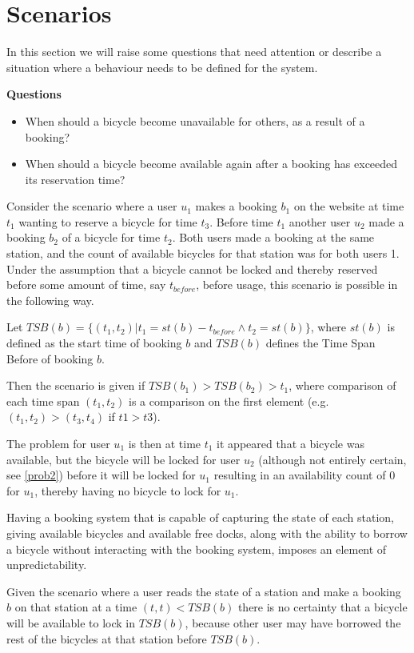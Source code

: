 \section{Scenarios}\label{sec:behaviourProblems}
In this section we will raise some questions that need attention or describe a situation where a behaviour needs to be defined for the system.

\textbf{Questions}
\begin{itemize}
\item When should a bicycle become unavailable for others, as a result of a booking?
\item When should a bicycle become available again after a booking has exceeded its reservation time?
\end{itemize}

\begin{description}[style=nextline]\label{prob1}
\item[Problem 1.1] Consider the scenario where a user $u_1$ makes a booking $b_1$ on the website at time $t_1$ wanting to reserve a bicycle for time $t_3$. Before time $t_1$ another user $u_2$ made a booking $b_2$ of a bicycle for time $t_2$. Both users made a booking at the same station, and the count of available bicycles for that station was for both users 1. Under the assumption that a bicycle cannot be locked and thereby reserved before some amount of time, say $t_{before}$, before usage, this scenario is possible in the following way.

Let $TSB(b) = \{(t_1,t_2) | t_1 = st(b) - t_{before} \wedge t_2 = st(b) \}$, where $st(b)$ is defined as the start time of booking $b$ and $TSB(b)$ defines the Time Span Before of booking $b$.

Then the scenario is given if $TSB(b_1) > TSB(b_2) > t_1$, where comparison of each time span $(t_1, t_2)$ is a comparison on the first element (e.g. $(t_1, t_2) > (t_3, t_4)$ if $t1 > t3$).

The problem for user $u_1$ is then at time $t_1$ it appeared that a bicycle was available, but the bicycle will be locked for user $u_2$ (although not entirely certain, see \ref{prob2}) before it will be locked for $u_1$ resulting in an availability count of 0 for $u_1$, thereby having no bicycle to lock for $u_1$.
\end{description}

\begin{description}\label{prob2}
	\item[Problem 1.2] Having a booking system that is capable of capturing the state of each station, giving available bicycles and available free docks, along with the ability to borrow a bicycle without interacting with the booking system, imposes an element of unpredictability.
	
	Given the scenario where a user reads the state of a station and make a booking $b$ on that station at a time $(t,t) < TSB(b)$ there is no certainty that a bicycle will be available to lock in $TSB(b)$, because other user may have borrowed the rest of the bicycles at that station before $TSB(b)$.
\end{description}
